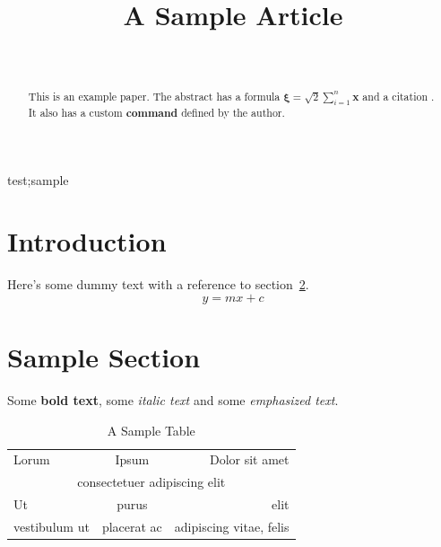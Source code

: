 \documentclass[wcp]{jmlr}
\author{\Name{Ann Other}\Email{sample@nowhere.com}\\\addr{University of Nowhere}}
\title{A Sample Article}
\newcommand*{\boldstuff}[1]{\textbf{#1}}
\begin{document}
\maketitle

\begin{abstract}
This is an example paper. The abstract has a formula
$\boldsymbol{\xi} = \surd2 \sum_{i=1}^n \mathbf{x}$
and a citation \citep{smith2005}. It also has a custom
\boldstuff{command} defined by the author.
\end{abstract}
\begin{keywords}
test;sample
\end{keywords}

\section{Introduction}

Here's some dummy text with a reference to section~\ref{sec:sample}.
\[
 y = mx + c
\]

\section{Sample Section}
\label{sec:sample}

Some \textbf{bold text}, some \textit{italic text} and some
\emph{emphasized text}.

\begin{table}[htbp]
\caption{A Sample Table}\label{tab:sample}
\centering
\begin{tabular}{@{+}l||cr}
\hline\hline
Lorum & Ipsum & Dolor sit amet\\
\multicolumn{3}{c}{consectetuer adipiscing elit}\\
Ut & purus & elit\\
vestibulum ut & placerat ac & adipiscing vitae, felis\\\hline
\end{tabular}
\end{table}


\end{document}
